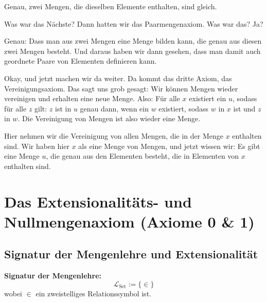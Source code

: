 \begin{spoken-clean}[continued]
Genau, zwei Mengen, die dieselben Elemente enthalten, sind gleich.
\end{spoken-clean}

\begin{spoken-clean}[00:12:15 - 00:15:06]
Was war das Nächste? Dann hatten wir das Paarmengenaxiom. Was war das? Ja?

Genau: Dass man aus zwei Mengen eine Menge bilden kann, die genau aus diesen zwei Mengen besteht. Und daraus haben wir dann gesehen, dass man damit auch geordnete Paare von Elementen definieren kann.

Okay, und jetzt machen wir da weiter. Da kommt das dritte Axiom, das Vereinigungsaxiom. Das sagt uns grob gesagt: Wir können Mengen wieder vereinigen und erhalten eine neue Menge. Also: Für alle $x$ existiert ein $u$, sodass für alle $z$ gilt: $z$ ist in $u$ genau dann, wenn ein $w$ existiert, sodass $w$ in $x$ ist und $z$ in $w$. Die Vereinigung von Mengen ist also wieder eine Menge.

Hier nehmen wir die Vereinigung von allen Mengen, die in der Menge $x$ enthalten sind. Wir haben hier $x$ als eine Menge von Mengen, und jetzt wissen wir: Es gibt eine Menge $u$, die genau aus den Elementen besteht, die in Elementen von $x$ enthalten sind.
\end{spoken-clean}

\section{Das Extensionalitäts- und Nullmengenaxiom (Axiome 0 \& 1)}

\subsection{Signatur der Mengenlehre und Extensionalität}

\begin{math-stroke}
\textbf{Signatur der Mengenlehre:}
\[
\mathcal{L}_{\text{Set}} := \{ \in \}
\]
wobei $\in$ ein zweistelliges Relationssymbol ist.

\begin{axioms}
\end{axioms}
\end{math-stroke}

